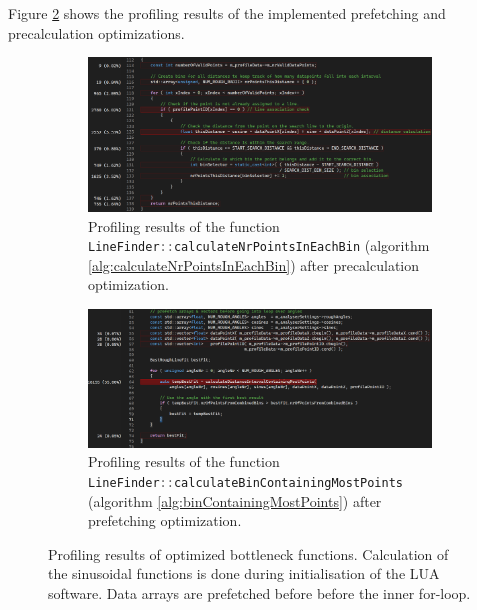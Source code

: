 Figure \ref{fig:profiling_bottleneck_optimized} shows the profiling results of the implemented prefetching and precalculation optimizations.

\begin{figure}[H]
    \centering
    \begin{subfigure}{\textwidth}
        \centering
        \includegraphics[width=\textwidth]{images/profiling_bottleneck_optimized.png}
        \caption{Profiling results of the function \lstinline[language=c]|LineFinder::calculateNrPointsInEachBin| (algorithm \ref{alg:calculateNrPointsInEachBin}) after precalculation optimization.}
    \end{subfigure}
    \begin{subfigure}{\textwidth}
        \centering
        \includegraphics[width=\textwidth]{images/profiling_results_precalculation.png}
        \caption{Profiling results of the function \lstinline[language=c]|LineFinder::calculateBinContainingMostPoints| (algorithm \ref{alg:binContainingMostPoints}) after prefetching optimization.}\label{fig:profiling_results_precalculation}
    \end{subfigure}
    \caption{Profiling results of optimized bottleneck functions. Calculation of the sinusoidal functions is done during initialisation of the LUA software. Data arrays are prefetched before before the inner for-loop.}
    \label{fig:profiling_bottleneck_optimized}
\end{figure}

